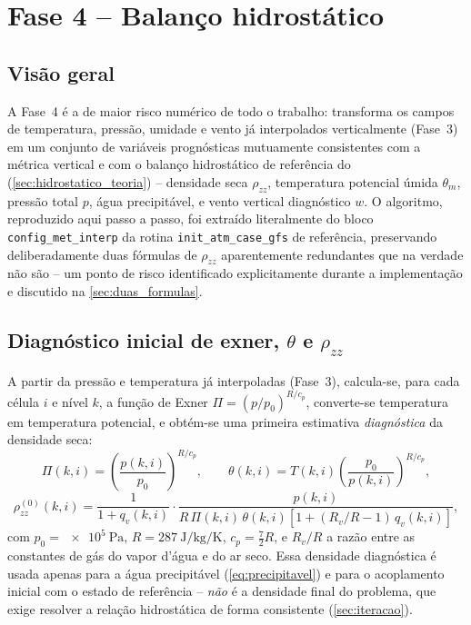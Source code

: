 \chapter{Fase 4 -- Balanço hidrostático}
\label{cap:fase4}

\section{Visão geral}

A Fase~4 é a de maior risco numérico de todo o trabalho: transforma os
campos de temperatura, pressão, umidade e vento já interpolados
verticalmente (Fase~3) em um conjunto de variáveis prognósticas
mutuamente consistentes com a métrica vertical e com o balanço
hidrostático de referência do \mpasa{} (\cref{sec:hidrostatico_teoria})
-- densidade seca $\rho_{zz}$, temperatura potencial úmida
$\theta_m$, pressão total $p$, água precipitável, e vento vertical
diagnóstico $w$. O algoritmo, reproduzido aqui passo a passo, foi
extraído literalmente do bloco \texttt{config\_met\_interp} da rotina
\texttt{init\_atm\_case\_gfs} de referência, preservando deliberadamente
duas fórmulas de $\rho_{zz}$ aparentemente redundantes que na verdade não
são -- um ponto de risco identificado explicitamente durante a
implementação e discutido na \cref{sec:duas_formulas}.

\section{Diagnóstico inicial de exner, $\theta$ e $\rho_{zz}$}

A partir da pressão e temperatura já interpoladas (Fase~3), calcula-se,
para cada célula $i$ e nível $k$, a função de Exner
$\Pi = (p/p_0)^{R/c_p}$, converte-se temperatura em temperatura
potencial, e obtém-se uma primeira estimativa \emph{diagnóstica} da
densidade seca:
\begin{equation}
  \Pi(k,i) = \left(\frac{p(k,i)}{p_0}\right)^{R/c_p},
  \qquad
  \theta(k,i) = T(k,i)\left(\frac{p_0}{p(k,i)}\right)^{R/c_p},
  \label{eq:exner_theta}
\end{equation}
\begin{equation}
  \rho_{zz}^{(0)}(k,i) = \frac{1}{1+q_v(k,i)}\cdot
  \frac{p(k,i)}{R\,\Pi(k,i)\,\theta(k,i)\left[1+(R_v/R - 1)\,q_v(k,i)\right]},
  \label{eq:rho_diagnostico}
\end{equation}
com $p_0=\SI{e5}{\pascal}$, $R=\SI{287}{\joule\per\kilo\gram\per\kelvin}$,
$c_p = \tfrac{7}{2}R$, e $R_v/R$ a razão entre as constantes de gás do
vapor d'água e do ar seco. Essa densidade diagnóstica é usada apenas para
a água precipitável (\cref{eq:precipitavel}) e para o acoplamento inicial
com o estado de referência -- \emph{não} é a densidade final do problema,
que exige resolver a relação hidrostática de forma consistente
(\cref{sec:iteracao}).

